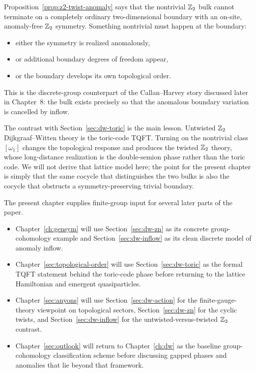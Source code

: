 \begin{remark}\label{rem:z2-anomaly-physical}
Proposition~\ref{prop:z2-twist-anomaly} says that the nontrivial $\mathbb{Z}_2$ bulk cannot terminate on a completely ordinary two-dimensional boundary with an on-site, anomaly-free $\mathbb{Z}_2$ symmetry. Something nontrivial must happen at the boundary:
\begin{itemize}
\item either the symmetry is realized anomalously,
\item or additional boundary degrees of freedom appear,
\item or the boundary develops its own topological order.
\end{itemize}
This is the discrete-group counterpart of the Callan--Harvey story discussed later in Chapter~8: the bulk exists precisely so that the anomalous boundary variation is cancelled by inflow.
\end{remark}

\begin{remark}\label{rem:dw-z2-phases}
The contrast with Section~\ref{sec:dw-toric} is the main lesson. Untwisted $\mathbb{Z}_2$ Dijkgraaf--Witten theory is the toric-code TQFT. Turning on the nontrivial class $[\omega_1]$ changes the topological response and produces the twisted $\mathbb{Z}_2$ theory, whose long-distance realization is the double-semion phase rather than the toric code. We will not derive that lattice model here; the point for the present chapter is simply that the same cocycle that distinguishes the two bulks is also the cocycle that obstructs a symmetry-preserving trivial boundary.
\end{remark}

\begin{remark}\label{rem:dw-downstream-map}
The present chapter supplies finite-group input for several later parts of the paper.
\begin{itemize}
\item Chapter~\ref{ch:gensym} will use Section~\ref{sec:dw-zn} as its concrete group-cohomology example and Section~\ref{sec:dw-inflow} as its clean discrete model of anomaly inflow.
\item Chapter~\ref{sec:topological-order} will use Section~\ref{sec:dw-toric} as the formal TQFT statement behind the toric-code phase before returning to the lattice Hamiltonian and emergent quasiparticles.
\item Chapter~\ref{sec:anyons} will use Section~\ref{sec:dw-action} for the finite-gauge-theory viewpoint on topological sectors, Section~\ref{sec:dw-zn} for the cyclic twists, and Section~\ref{sec:dw-inflow} for the untwisted-versus-twisted $\mathbb{Z}_2$ contrast.
\item Chapter~\ref{sec:outlook} will return to Chapter~\ref{ch:dw} as the baseline group-cohomology classification scheme before discussing gapped phases and anomalies that lie beyond that framework.
\end{itemize}
\end{remark}

